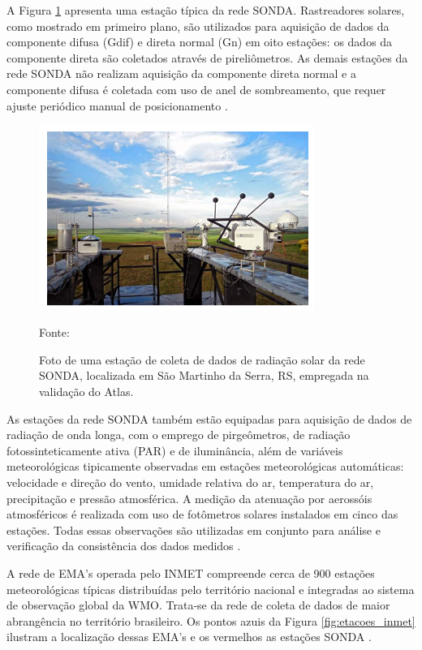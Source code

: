 A Figura \ref{fig:estacao_solar} apresenta uma estação típica da rede SONDA. Rastreadores solares, como mostrado em primeiro plano, são utilizados para aquisição de dados da componente difusa (Gdif) e direta normal (Gn) em oito estações: os dados da componente direta são coletados através de pireliômetros. As demais estações da rede SONDA não realizam aquisição da componente direta normal e a componente difusa é coletada com uso de anel de sombreamento, que requer ajuste periódico manual de posicionamento \cite{atlas2017}.

\begin{figure}[H]
    \centering
    \includegraphics[width=0.8\textwidth]{./Figuras/estacao_solar.png}
    \caption{Foto de uma estação de coleta de dados de radiação solar da rede SONDA, localizada em São Martinho da Serra, RS, empregada na validação do Atlas.}{Fonte: \cite{atlas2017}}
   \label{fig:estacao_solar}
\end{figure}

As estações da rede SONDA também estão equipadas para aquisição de dados de radiação de onda longa, com o emprego de pirgeômetros, de radiação fotossinteticamente ativa (PAR) e de iluminância, além de variáveis meteorológicas tipicamente observadas em estações meteorológicas automáticas: velocidade e direção do vento, umidade relativa do ar, temperatura do ar, precipitação e pressão atmosférica. A medição da atenuação por aerossóis atmosféricos é realizada com uso de fotômetros solares instalados em cinco das estações. Todas essas observações são utilizadas em conjunto para análise e verificação da consistência dos dados medidos \cite{atlas2017}.

A rede de EMA’s operada pelo INMET compreende cerca de 900 estações meteorológicas típicas distribuídas pelo território nacional e integradas ao sistema de observação global da WMO. Trata‐se da rede de coleta de dados de maior abrangência no território brasileiro. Os pontos azuis da Figura \ref{fig:etacoes_inmet} ilustram a localização dessas EMA’s e os vermelhos as estações SONDA \cite{atlas2017}.

